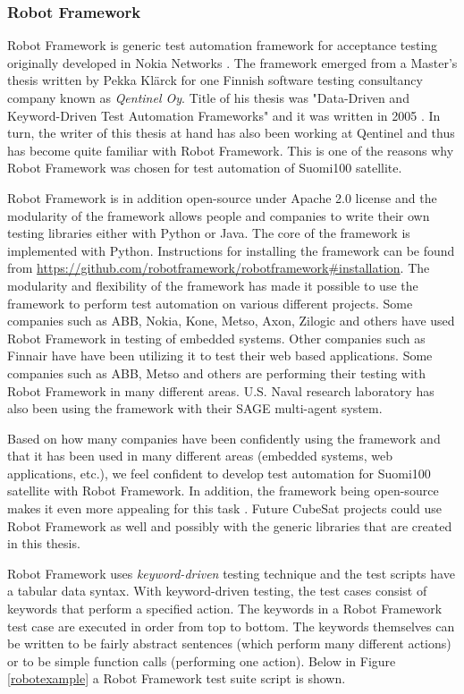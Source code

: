 \documentclass[english,12pt,a4paper,pdftex,elec,utf8]{aaltothesis}
\begin{document}
\subsubsection{Robot Framework}
Robot Framework is generic test automation framework for acceptance testing originally developed in Nokia Networks \cite{robotmain}. The framework emerged from a Master's thesis written by Pekka Klärck for one Finnish software testing consultancy company known as \textit{Qentinel Oy}. Title of his thesis was "Data-Driven and Keyword-Driven Test Automation Frameworks" and it was written in 2005 \cite{robotmain, klerkdippa}. In turn, the writer of this thesis at hand has also been working at Qentinel and thus has become quite familiar with Robot Framework. This is one of the reasons why Robot Framework was chosen for test automation of Suomi100 satellite. \par 
Robot Framework is in addition open-source under Apache 2.0 license and the modularity of the framework allows people and companies to write their own testing libraries either with Python or Java. The core of the framework is implemented with Python. Instructions for installing the framework can be found from \url{https://github.com/robotframework/robotframework#installation}.
The modularity and flexibility of the framework has made it possible to use the framework to perform test automation on various different projects. Some companies such as ABB, Nokia, Kone, Metso, Axon, Zilogic and others have used Robot Framework in testing of embedded systems. Other companies such as Finnair have have been utilizing it to test their web based applications. Some companies such as ABB, Metso and others are performing their testing with Robot Framework in many different areas. U.S. Naval research laboratory has also been using the framework with their SAGE multi-agent system. \cite{robotmain}\par 
Based on how many companies have been confidently using the framework \cite{robotmain} and that it has been used in many different areas (embedded systems, web applications, etc.), we feel confident to develop test automation for Suomi100 satellite with Robot Framework. In addition, the framework being open-source makes it even more appealing for this task \cite{robotmain}. Future CubeSat projects could use Robot Framework as well and possibly with the generic libraries that are created in this thesis.\par
Robot Framework uses \textit{keyword-driven} testing technique and the test scripts have a tabular data syntax. With keyword-driven testing, the test cases consist of keywords that perform a specified action. The keywords in a Robot Framework test case are executed in order from top to bottom. The keywords themselves can be written to be fairly abstract sentences (which perform many different actions) or to be simple function calls (performing one action). Below in Figure \ref{robotexample} a Robot Framework test suite script is shown. \cite{robotuserguide}\par 
\end{document}
